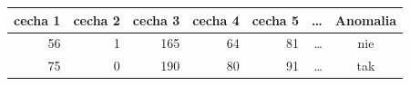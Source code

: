 \begin{tabular}{rrrrrrc}
\toprule
cecha 1 & cecha 2 & cecha 3 & cecha 4 & cecha 5 & \dots & Anomalia \\
\midrule
56 & 1 & 165 & 64 & 81 & \dots & nie \\
75 & 0 & 190 & 80 & 91 & \dots & tak \\
\bottomrule
\end{tabular}
